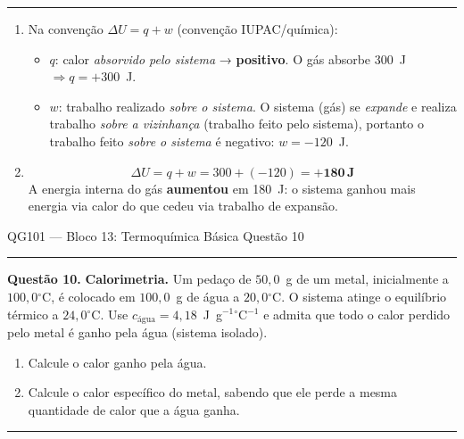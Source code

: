 \documentclass[10pt,a4paper]{article}
\newcommand{\oC}{$^\circ$C}
\newcommand{\questaoheader}[1]{%
  \begin{center}
  {\small\sffamily QG101 --- Bloco 13: Termoquímica Básica
  \hfill Questão #1}
  \end{center}
  \vspace{-0.3cm}
  \noindent\rule{\textwidth}{0.6pt}
  \vspace{0.1cm}
}
\newcommand{\resolucaosep}{%
  \vspace{0.4cm}
  \noindent\rule{\textwidth}{0.4pt}
  \vspace{0.1cm}

  \noindent{\bf Resolução:}
  \vspace{0.2cm}
}
\begin{document}
\resolucaosep

\begin{enumerate}
  \item Na convenção $\Delta U = q + w$ (convenção IUPAC/química):
        \begin{itemize}
          \item $q$: calor \emph{absorvido pelo sistema} → \textbf{positivo}.
                O gás absorbe 300~J $\Rightarrow q = +300$~J.

          \item $w$: trabalho realizado \emph{sobre o sistema}. O sistema
                (gás) se \emph{expande} e realiza trabalho \emph{sobre a
                vizinhança} (trabalho feito pelo sistema), portanto o
                trabalho feito \emph{sobre o sistema} é negativo:
                $w = -120$~J.
        \end{itemize}

  \item
        \[
          \Delta U = q + w = 300 + (-120) = \mathbf{+180\,\text{J}}
        \]
        A energia interna do gás \textbf{aumentou} em 180~J: o sistema
        ganhou mais energia via calor do que cedeu via trabalho de
        expansão.
\end{enumerate}

\clearpage

\questaoheader{10}

\noindent\textbf{Questão 10.}
\textbf{Calorimetria.} Um pedaço de $50{,}0$~g de um metal, inicialmente a
$100{,}0$\oC, é colocado em $100{,}0$~g de água a $20{,}0$\oC. O sistema
atinge o equilíbrio térmico a $24{,}0$\oC. Use
$c_{\text{água}} = 4{,}18$~J~g$^{-1}$\oC$^{-1}$ e admita que todo o calor
perdido pelo metal é ganho pela água (sistema isolado).
\begin{enumerate}
  \item Calcule o calor ganho pela água.
  \item Calcule o calor específico do metal, sabendo que ele perde a
        mesma quantidade de calor que a água ganha.
\end{enumerate}

\resolucaosep
\end{document}
